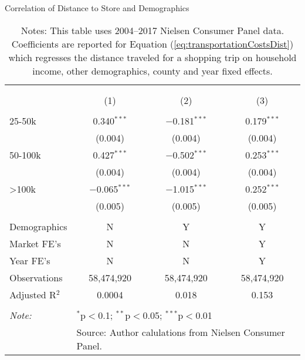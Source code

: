 \begin{table}[!htbp] \centering
  \caption{Correlation of Distance to Store and Demographics}
  \label{tab:transportationCostsDist}
\begin{tabular}{@{\extracolsep{5pt}}lccc}
\\[-1.8ex]\hline
\hline \\[-1.8ex]
\\[-1.8ex] & (1) & (2) & (3)\\
\hline \\[-1.8ex]
 25-50k & 0.340$^{***}$ & $-$0.181$^{***}$ & 0.179$^{***}$ \\
  & (0.004) & (0.004) & (0.004) \\
  50-100k & 0.427$^{***}$ & $-$0.502$^{***}$ & 0.253$^{***}$ \\
  & (0.004) & (0.004) & (0.004) \\
  >100k & $-$0.065$^{***}$ & $-$1.015$^{***}$ & 0.252$^{***}$ \\
  & (0.005) & (0.005) & (0.005) \\
 \hline \\[-1.8ex]
Demographics & N & Y & Y \\
Market FE's & N & N & Y \\
Year FE's & N & N & Y \\
Observations & 58,474,920 & 58,474,920 & 58,474,920 \\
Adjusted R$^{2}$ & 0.0004 & 0.018 & 0.153 \\
\hline
\hline \\[-1.8ex]
\textit{Note:}  & \multicolumn{3}{l}{$^{*}$p$<$0.1; $^{**}$p$<$0.05; $^{***}$p$<$0.01} \\
 & \multicolumn{3}{l}{Source: Author calulations from Nielsen Consumer Panel.} \\
\end{tabular}
\caption*{Notes: This table uses 2004--2017 Nielsen Consumer Panel data. Coefficients are reported for Equation (\ref{eq:transportationCostsDist}) which regresses the distance traveled for a shopping trip on household income, other demographics, county and year fixed effects.}
\end{table}
